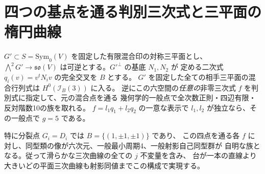 \section{四つの基点を通る判別三次式と三平面の楕円曲線}
\label{sec:marked-cubic-linear-system}
\begin{theorem}\label{thm:marked-cubic-linear-system}
$G'\subset S=\mathrm{Sym}_0(V)$ を固定した有限混合印の対称三平面とし、
$\bigwedge^2G'\to\mathfrak{so}(V)$ は可逆とする。$G'^\perp$ の基底 $N_1,N_2$ が
定める二次式 $q_i(v)=v^tN_i v$ の完全交叉を $B$ とする。
$G'$ を固定した全ての相手三平面の混合行列式は $H^0(\mathcal I_B(3))$ に入る。
逆にこの六空間の\emph{任意の}非零三次式 $f$ を判別式に指定して、元の混合点を通る
幾何学的一般点で全次数正則・四辺有限・反対階数10の族を取れる。
$f=l_1q_1+l_2q_2$ の一意な表示で $l_1,l_2$ が独立なら、その一般点で $g=5$ である。

特に分裂点 $G_i=D_i$ では $B=\{(1,\pm1,\pm1)\}$ であり、
この四点を通る各 $f$ に対し、同型類の像が六次元、一般最小周期4、一般射影自己同型群が
自明な族となる。従って滑らかな三次曲線の全ての $j$ 不変量を含み、
台が一本の直線より大きいどの平面三次曲線も射影同値までこの構成で実現する。
\end{theorem}

